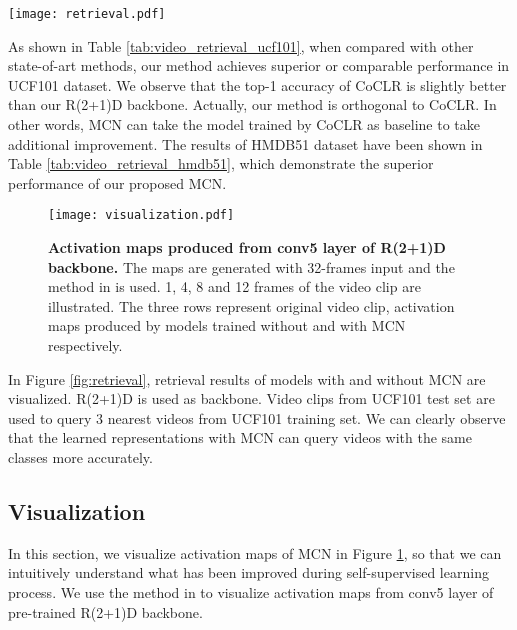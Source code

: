 \documentclass[10pt,twocolumn,letterpaper]{article}
\begin{document}
\begin{figure*}
\begin{center}
\texttt{[image: retrieval.pdf]}
\end{center}
		\vspace{-0.3cm}
   \caption{\textbf{Video retrieval examples on UCF101.} The first column represents query videos from the test split, and the remaining columns are top-3 results retrieved by the models trained without and with MCN from the training split. The class name of each video is shown in bottom. Red fonts denote wrong video retrieval results.} 
\label{fig:retrieval}
\end{figure*}


As shown in Table \ref{tab:video_retrieval_ucf101}, when compared with other state-of-art methods, our method achieves superior or comparable performance in UCF101 dataset. We observe that the top-1 accuracy of CoCLR is slightly better than our R(2+1)D backbone. Actually, our method is orthogonal to CoCLR. In other words, MCN can take the model trained by CoCLR as baseline to take additional improvement. The results of HMDB51 dataset have been shown in Table \ref{tab:video_retrieval_hmdb51}, which  demonstrate the superior performance of our proposed MCN.

\begin{figure}[H]
\centering
\texttt{[image: visualization.pdf]}
\caption{\textbf{Activation maps produced from conv5 layer of R(2+1)D backbone.} The maps are generated with 32-frames input and the method in \cite{zagoruyko2016paying} is used. 1, 4, 8 and 12 frames of the video clip are illustrated. The three rows represent original video clip, activation maps produced by models trained without and with MCN respectively. }
\label{fig:vis_sample}
\centering
\end{figure}


\vspace{-0.1cm}
In Figure \ref{fig:retrieval}, retrieval results of models with and without MCN are visualized. R(2+1)D is used as backbone. Video clips from UCF101 test set are used to query 3 nearest videos from UCF101 training set. We can clearly observe that the learned representations with MCN can query videos with the same classes more accurately.

	
\subsection{Visualization}
In this section, we visualize activation maps of MCN in Figure \ref{fig:vis_sample}, so that we can intuitively understand what has been improved during self-supervised learning process. We use the method in \cite{zagoruyko2016paying} to visualize activation maps from conv5 layer of pre-trained R(2+1)D backbone.
\end{document}
